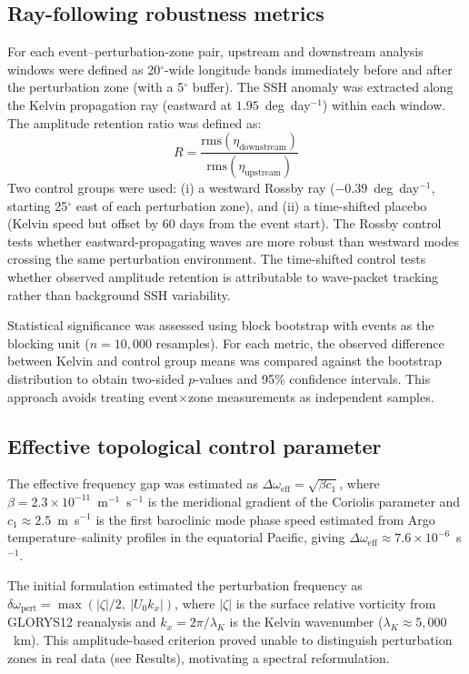 \documentclass[11pt]{article}
\begin{document}
\subsection{Ray-following robustness metrics}

For each event--perturbation-zone pair, upstream and downstream analysis windows were defined as 20$^\circ$-wide longitude bands immediately before and after the perturbation zone (with a 5$^\circ$ buffer). The SSH anomaly was extracted along the Kelvin propagation ray (eastward at $1.95$~deg~day$^{-1}$) within each window. The amplitude retention ratio was defined as:
\begin{equation}
R = \frac{\mathrm{rms}(\eta_\mathrm{downstream})}{\mathrm{rms}(\eta_\mathrm{upstream})}
\end{equation}
Two control groups were used: (i) a westward Rossby ray ($-0.39$~deg~day$^{-1}$, starting 25$^\circ$ east of each perturbation zone), and (ii) a time-shifted placebo (Kelvin speed but offset by 60 days from the event start). The Rossby control tests whether eastward-propagating waves are more robust than westward modes crossing the same perturbation environment. The time-shifted control tests whether observed amplitude retention is attributable to wave-packet tracking rather than background SSH variability.

Statistical significance was assessed using block bootstrap with events as the blocking unit ($n = 10{,}000$ resamples). For each metric, the observed difference between Kelvin and control group means was compared against the bootstrap distribution to obtain two-sided $p$-values and 95\% confidence intervals. This approach avoids treating event$\times$zone measurements as independent samples.

\subsection{Effective topological control parameter}

The effective frequency gap was estimated as $\Delta\omega_\mathrm{eff} = \sqrt{\beta c_1}$, where $\beta = 2.3 \times 10^{-11}$~m$^{-1}$~s$^{-1}$ is the meridional gradient of the Coriolis parameter and $c_1 \approx 2.5$~m~s$^{-1}$ is the first baroclinic mode phase speed estimated from Argo temperature--salinity profiles\cite{Roemmich2009} in the equatorial Pacific, giving $\Delta\omega_\mathrm{eff} \approx 7.6 \times 10^{-6}$~s$^{-1}$.

The initial formulation estimated the perturbation frequency as $\delta\omega_\mathrm{pert} = \max(|\zeta|/2,\ |U_0 k_x|)$, where $|\zeta|$ is the surface relative vorticity from GLORYS12 reanalysis and $k_x = 2\pi / \lambda_K$ is the Kelvin wavenumber ($\lambda_K \approx 5{,}000$~km). This amplitude-based criterion proved unable to distinguish perturbation zones in real data (see Results), motivating a spectral reformulation.
\end{document}
